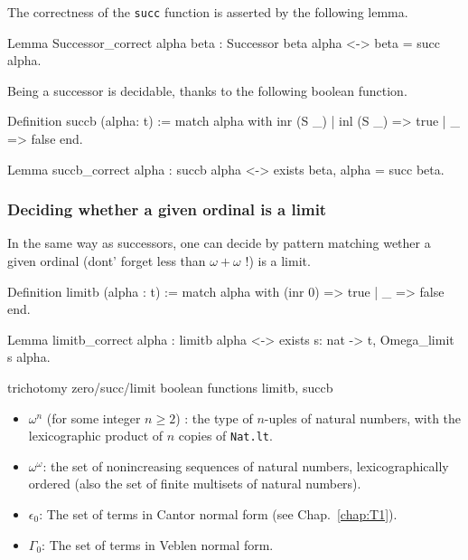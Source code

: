The correctness  of the \texttt{succ} function is asserted by the following lemma.


\begin{Coqsrc}
Lemma Successor_correct alpha beta : Successor beta alpha <-> beta = succ alpha.
\end{Coqsrc}


Being a successor is decidable, thanks to the following boolean function.


\begin{Coqsrc}
Definition succb (alpha: t) := match alpha with
                                   inr (S  _) | inl (S _) => true
                                 | _ => false
                                 end.

Lemma succb_correct alpha : succb alpha <-> exists beta,  alpha = succ beta.
\end{Coqsrc}



\subsubsection{Deciding whether a given ordinal is a limit}

In the same way as successors, one can decide by pattern matching wether a given ordinal (dont' forget less than $\omega+\omega$ !) is a limit.

\begin{Coqsrc}
Definition limitb (alpha : t) := match alpha with
                                     (inr 0) => true
                                   | _ => false
                                   end.

Lemma limitb_correct alpha  : limitb alpha <-> 
                              exists s: nat -> t, Omega_limit s alpha.
\end{Coqsrc}






\begin{todo}
trichotomy zero/succ/limit
boolean functions limitb, succb


\end{todo}
\begin{itemize}
\item $\omega^n$ (for some  integer  $n\geq 2$) : the type of $n$-uples of natural numbers, with the lexicographic product of $n$ copies of \texttt{Nat.lt}.
\item  $\omega^\omega$: the set of nonincreasing sequences of natural numbers, lexicographically ordered (also the set of finite multisets of natural numbers).
\item $\epsilon_0$: The set of terms in Cantor normal form (see Chap.~\ref{chap:T1}).
\item $\Gamma_0$: The set of terms in Veblen normal form.
\end{itemize}



